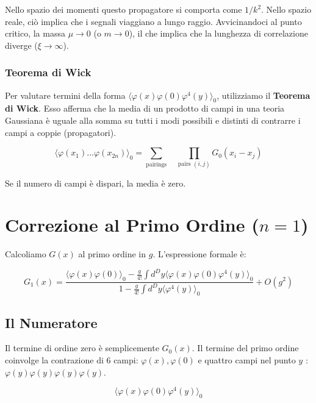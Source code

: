 Nello spazio dei momenti questo propagatore si comporta come $1/k^2$.
Nello spazio reale, ciò implica che i segnali viaggiano a lungo raggio.
Avvicinandoci al punto critico, la massa $\mu \to 0$ (o $m \to 0$), il che implica che la lunghezza di correlazione diverge ($\xi \to \infty$).

\subsubsection{Teorema di Wick}

Per valutare termini della forma $\langle \varphi(x)\varphi(0)\varphi^4(y) \rangle_0$, utilizziamo il \textbf{Teorema di Wick}.
Esso afferma che la media di un prodotto di campi in una teoria Gaussiana è uguale alla somma su tutti i modi possibili e distinti di contrarre i campi a coppie (propagatori).

\begin{equation}
    \langle \varphi(x_1) \dots \varphi(x_{2n}) \rangle_0 = \sum_{\text{pairings}}\quad \prod_{\text{pairs } (i,j)} G_0(x_i - x_j)
\end{equation}

Se il numero di campi è dispari, la media è zero.

\section{Correzione al Primo Ordine ($n=1$)}

Calcoliamo $G(x)$ al primo ordine in $g$.
L'espressione formale è:

\begin{equation}
    G_1(x) = \frac{\langle \varphi(x)\varphi(0) \rangle_0 - \frac{g}{4!} \int d^D y \langle \varphi(x)\varphi(0)\varphi^4(y) \rangle_0}{1 - \frac{g}{4!} \int d^D y \langle \varphi^4(y) \rangle_0} + O(g^2)
    \label{eq:G1_fraction}
\end{equation}

\subsection{Il Numeratore}
Il termine di ordine zero è semplicemente $G_0(x)$.
Il termine del primo ordine coinvolge la contrazione di 6 campi: $\varphi(x), \varphi(0)$ e quattro campi nel punto $y$ :  $\varphi(y)\varphi(y)\varphi(y)\varphi(y)$.

\begin{equation}
    \langle \varphi(x)\varphi(0)\varphi^4(y) \rangle_0
\end{equation}

